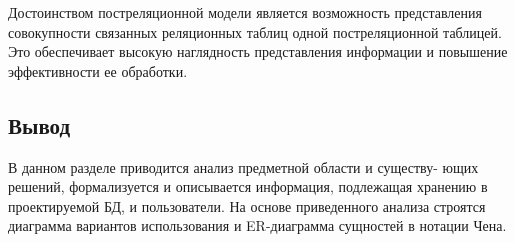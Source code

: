 Достоинством постреляционной модели является возможность представления совокупности связанных реляционных таблиц одной постреляционной
таблицей. Это обеспечивает высокую наглядность представления информации и повышение эффективности ее обработки\cite{парфенов2016постреляционные}.

\subsection*{Вывод}

В данном разделе приводится анализ предметной области и существу-
ющих решений,  формализуется и описывается информация, подлежащая хранению в проектируемой БД, и пользователи. На основе приведенного анализа строятся диаграмма вариантов использования и ER-диаграмма сущностей в нотации Чена. 